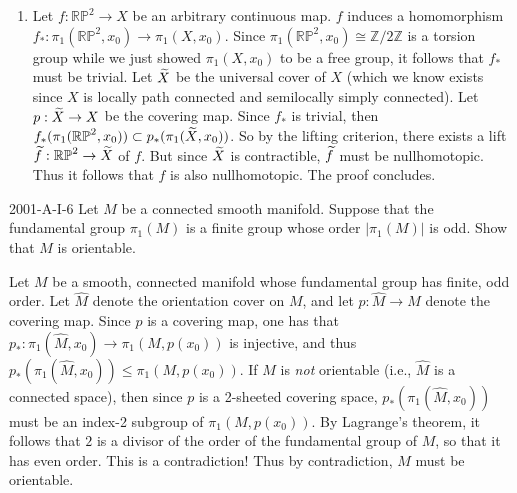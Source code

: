 \documentclass{article}
\begin{document}
\begin{enumerate}[itemsep =-2pt,label = (\roman{*})]
		Here, since $U \cap V$ is simply connected, by the Seifert-van Kampen Theorem, one has 
		\begin{equation*}
			\pi_1(X, x_0) \cong \pi_1(U,x_0) \ast \pi_1(V,x_0). 
		\end{equation*}
		$V$ is homotopy equivalent to $S^1$, and thus, $\pi_1(V,x_0) \cong \mathbb{Z}$. On the other hand, $U$ is homotopy equivalent to the wedge sum $S^1 \vee S^1$ so that $\pi_1(U,x_0) \cong \mathbb{Z} \ast \mathbb{Z}$. Thus, we conclude that the fundamental group of $X$ is the free group on three generators. 
		\item Let $f: \mathbb{RP}^2 \to X$ be an arbitrary continuous map. $f$ induces a homomorphism $f_{\ast}: \pi_1(\mathbb{RP}^2, x_{0}) \to \pi_1(X, x_0)$. Since $\pi_1(\mathbb{RP}^2,x_0) \cong \mathbb{Z}/2\mathbb{Z}$ is a torsion group while we just showed $\pi_{1}(X,x_0)$ to be a free group, it follows that $f_\ast$ must be trivial. Let $\widetilde{X}$ be the universal cover of $X$ (which we know exists since $X$ is locally path connected and semilocally simply connected). Let $p: \widetilde{X} \to X$ be the covering map. Since $f_\ast$ is trivial, then $f_\ast(\pi_1(\mathbb{RP}^2,x_0)) \subset p_\ast(\pi_1(\widetilde{X}, x_0))$. So by the lifting criterion, there exists a lift $\widetilde{f}: \mathbb{RP}^2 \to \widetilde{X}$ of $f$. But since $\widetilde{X}$ is contractible, $\widetilde{f}$ must be nullhomotopic. Thus it follows that $f$ is also nullhomotopic. The proof concludes. 
	\end{enumerate}
	
	\begin{prb}{2001-A-I-6}
		Let $M$ be a connected smooth manifold. Suppose that the fundamental group $\pi_1(M)$ is a finite group whose order $|\pi_1(M)|$ is odd. Show that $M$ is orientable. 
	\end{prb}
	Let $M$ be a smooth, connected manifold whose fundamental group has finite, odd order. Let $\hat{M}$ denote the orientation cover on $M$, and let $p: \hat{M} \to M$ denote the covering map. Since $p$ is a covering map, one has that $p_{\ast}: \pi_1(\hat{M}, x_0) \to \pi_1(M, p(x_0))$ is injective, and thus $p_\ast(\pi_1(\hat{M}, x_0)) \leq \pi_1(M, p(x_0))$. If $M$ is \textit{not} orientable (i.e., $\hat{M}$ is a connected space), then since $p$ is a 2-sheeted covering space, $p_\ast(\pi_1(\hat{M}, x_0))$ must be an index-2 subgroup of $\pi_1(M,p(x_0))$. By Lagrange's theorem, it follows that $2$ is a divisor of the order of the fundamental group of $M$, so that it has even order. This is a contradiction! Thus by contradiction, $M$ must be orientable. 
	
\end{document}
